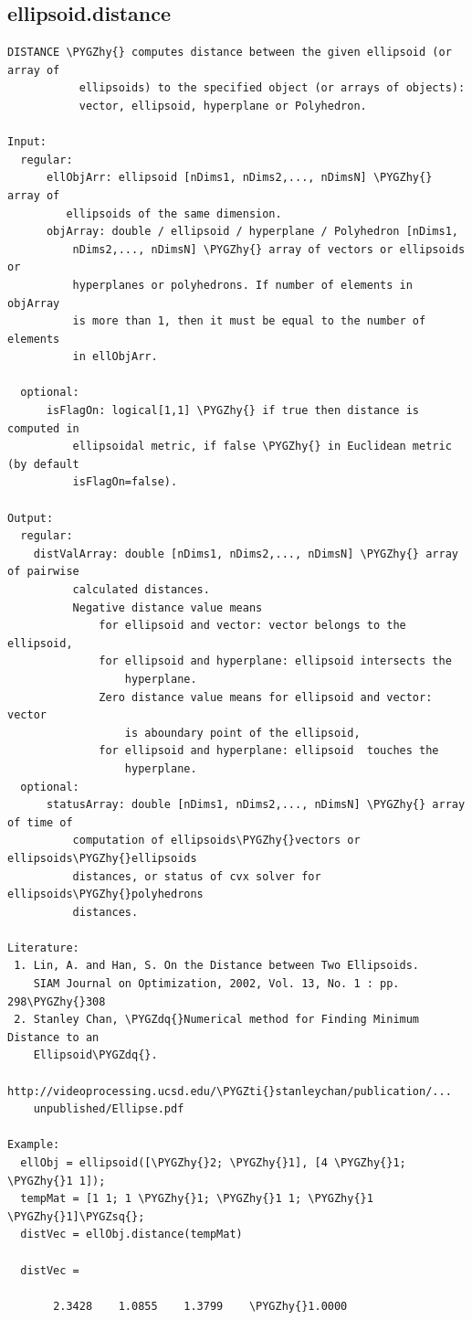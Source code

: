 \documentclass[letterpaper,10pt,english]{sphinxmanual}
\def\PYGZhy{\char`\-}
\def\PYGZsq{\char`\'}
\def\PYGZdq{\char`\"}
\def\PYGZti{\char`\~}
\begin{document}
\subsection{ellipsoid.distance}
\label{chap_functions:ellipsoid-distance}
\begin{Verbatim}[commandchars=\\\{\}]
DISTANCE \PYGZhy{} computes distance between the given ellipsoid (or array of
           ellipsoids) to the specified object (or arrays of objects):
           vector, ellipsoid, hyperplane or Polyhedron.

Input:
  regular:
      ellObjArr: ellipsoid [nDims1, nDims2,..., nDimsN] \PYGZhy{}  array of
         ellipsoids of the same dimension.
      objArray: double / ellipsoid / hyperplane / Polyhedron [nDims1,
          nDims2,..., nDimsN] \PYGZhy{} array of vectors or ellipsoids or
          hyperplanes or polyhedrons. If number of elements in objArray
          is more than 1, then it must be equal to the number of elements
          in ellObjArr.

  optional:
      isFlagOn: logical[1,1] \PYGZhy{} if true then distance is  computed in
          ellipsoidal metric, if false \PYGZhy{} in Euclidean metric (by default
          isFlagOn=false).

Output:
  regular:
    distValArray: double [nDims1, nDims2,..., nDimsN] \PYGZhy{} array of pairwise
          calculated distances.
          Negative distance value means
              for ellipsoid and vector: vector belongs to the ellipsoid,
              for ellipsoid and hyperplane: ellipsoid intersects the
                  hyperplane.
              Zero distance value means for ellipsoid and vector: vector
                  is aboundary point of the ellipsoid,
              for ellipsoid and hyperplane: ellipsoid  touches the
                  hyperplane.
  optional:
      statusArray: double [nDims1, nDims2,..., nDimsN] \PYGZhy{} array of time of
          computation of ellipsoids\PYGZhy{}vectors or ellipsoids\PYGZhy{}ellipsoids
          distances, or status of cvx solver for ellipsoids\PYGZhy{}polyhedrons
          distances.

Literature:
 1. Lin, A. and Han, S. On the Distance between Two Ellipsoids.
    SIAM Journal on Optimization, 2002, Vol. 13, No. 1 : pp. 298\PYGZhy{}308
 2. Stanley Chan, \PYGZdq{}Numerical method for Finding Minimum Distance to an
    Ellipsoid\PYGZdq{}.
    http://videoprocessing.ucsd.edu/\PYGZti{}stanleychan/publication/...
    unpublished/Ellipse.pdf

Example:
  ellObj = ellipsoid([\PYGZhy{}2; \PYGZhy{}1], [4 \PYGZhy{}1; \PYGZhy{}1 1]);
  tempMat = [1 1; 1 \PYGZhy{}1; \PYGZhy{}1 1; \PYGZhy{}1 \PYGZhy{}1]\PYGZsq{};
  distVec = ellObj.distance(tempMat)

  distVec =

       2.3428    1.0855    1.3799    \PYGZhy{}1.0000
\end{Verbatim}
\end{document}
